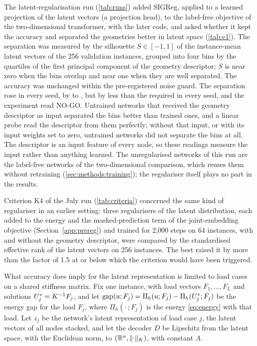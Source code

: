 The latent-regularisation run (\cref{tab:runs}) added SIGReg, applied to a learned
projection of the latent vectors (a projection head), to the label-free objective of the
two-dimensional transformer, with the later code, and asked whether it kept the accuracy and
separated the geometries better in latent space (\cref{tab:e1}). The separation was measured
by the silhouette $S\in[-1,1]$ of the instance-mean latent vectors of the 256 validation
instances, grouped into four bins by the quartiles of the first principal component of the
geometry descriptor; $S$ is near zero when the bins overlap and near one when they are well
separated. The accuracy was unchanged within the pre-registered noise guard. The separation
rose in every seed, by \numEOneDeltaMin{} to \numEOneDeltaMax{}, but by less than the
\numEOneFloor{} required in every seed, and the experiment read NO-GO. Untrained networks
that received the geometry descriptor as input separated the bins better than trained
ones, and a linear probe read the descriptor from them perfectly; without that input, or
with its input weights set to zero, untrained networks did not separate the bins at all.
The descriptor is an input feature of every node, so these readings measure the input
rather than anything learned. The unregularised networks of this run are the label-free
networks of the two-dimensional comparison, which reuses them without retraining
(\cref{sec:methods:training}); the regulariser itself plays no part in the results.

Criterion K4 of the July run (\cref{tab:criteria}) concerned the same kind of regulariser in
an earlier setting: three regularisers of the latent distribution, each added to the energy
and the masked-prediction term of the joint-embedding objective (Section~\ref{app:prereg})
and trained for 2,000 steps on 64 instances, with and without the geometry descriptor, were
compared by the standardised effective rank of the latent vectors on 256 instances. The best
raised it by more than the factor of 1.5 at or below which the criterion would have been
triggered.

What accuracy does imply for the latent representation is limited to load cases on a
shared stiffness matrix. Fix one instance, with load vectors $F_1,\dots,F_L$ and solutions
$U^{\ast}_j=K^{-1}F_j$, and let $\operatorname{gap}(u;F_j)=\Pi_h(u;F_j)-\Pi_h(U^{\ast}_j;F_j)$ be the energy
gap for the load $F_j$, where $\Pi_h(\cdot\,;F_j)$ is the energy \eqref{eq:energy} with that
load. Let $z_j$ be the network's latent representation of load case $j$, the latent vectors
of all nodes stacked, and let the decoder $D$ be Lipschitz from the latent space, with the
Euclidean norm, to $(\mathbb{R}^{n},\lVert \cdot\rVert_K)$, with constant $\Lambda$.

